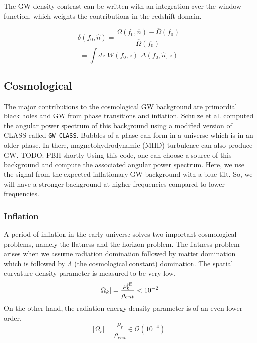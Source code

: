 The GW density contrast can be written with an integration over the window function, which weights the contributions in the redshift domain.

\begin{equation}
    \delta(f_0, \hat{n}) = \frac{\Omega(f_0, \hat{n})-\overline{\Omega}(f_0)}{\overline{\Omega}(f_0)}
\end{equation}
\begin{equation}
    = \int dz \; W(f_0, z) \; \Delta(f_0, \hat{n}, z)
\end{equation}

\subsection{Cosmological}
The major contributions to the cosmological GW background are primordial
black holes and GW from phase transitions and inflation.
Schulze et al. \cite{schulze_gw_class_2023} computed the angular power spectrum of this background using a modified version of CLASS \cite{blas_cosmic_2011} called {\tt GW\_CLASS}.
Bubbles of a phase can form in a universe which is in an older phase. In there, magnetohydrodynamic (MHD) turbulence can also produce GW.
TODO: PBH shortly
Using this code, one can choose a source of this background and compute the associated angular power spectrum. Here, we use the signal from the expected inflationary GW background with a blue tilt. So, we will have a stronger background at higher frequencies compared to lower frequencies. 

\subsubsection{Inflation}

A period of inflation in the early universe solves two important cosmological problems, namely the flatness and the horizon problem. The flatness problem arises when we assume radiation domination followed by matter domination which is followed by $\Lambda$ (the cosmological constant) domination. The spatial curvature density parameter is measured to be very low. 
\begin{equation}
    |\Omega_k| = \frac{\rho_k^{\rm{eff}}}{\rho_{crit}} < 10^{-2}
\end{equation} 
On the other hand, the radiation energy density parameter is of an even lower order.
\begin{equation}
    |\Omega_r| = \frac{\rho_r}{\rho_{crit}} \in \mathcal{O}(10^{-4}) 
\end{equation}

